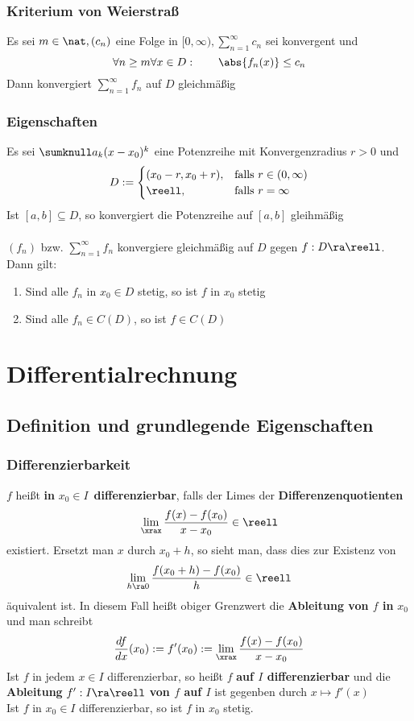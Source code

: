 \documentclass{kit}
\begin{document}
    \subsubsection{Kriterium von Weierstraß}
      Es sei $m\in\nat,(c_n)$ eine Folge in $[0,\infty),\sum^\infty_{n=1}c_n$ sei konvergent und
      $$\forall n\ge m\forall x\in D:\qquad\abs{f_n(x)}\le c_n$$
      Dann konvergiert $\sum^\infty_{n=1}f_n$ auf $D$ gleichmäßig
    \subsubsection{Eigenschaften}
      Es sei $\sumknull a_k(x-x_0)^k$ eine Potenzreihe mit Konvergenzradius $r>0$ und
      $$D:=\begin{cases}
        (x_0-r,x_0+r), & \text{falls }r\in(0,\infty)\\
        \reell, & \text{falls }r=\infty
      \end{cases}$$
      Ist $[a,b]\subseteq D$, so konvergiert die Potenzreihe auf $[a,b]$ gleihmäßig\\
      \\
      $(f_n)$ bzw. $\sum^\infty_{n=1}f_n$ konvergiere gleichmäßig auf $D$ gegen $f:D\ra\reell$. Dann gilt:
      \begin{enumerate}
        \item Sind alle $f_n$ in $x_0\in D$ stetig, so ist $f$ in $x_0$ stetig
        \item Sind alle $f_n\in C(D)$, so ist $f\in C(D)$
      \end{enumerate}
\section{Differentialrechnung}
  \subsection{Definition und grundlegende Eigenschaften}
    \subsubsection{Differenzierbarkeit}
      $f$ heißt \textbf{in} $x_0\in I$ \textbf{differenzierbar}, falls der Limes der \textbf{Differenzenquotienten}
      $$\lim_\xrax\frac{f(x)-f(x_0)}{x-x_0}\in\reell$$
      existiert. Ersetzt man $x$ durch $x_0+h$, so sieht man, dass dies zur Existenz von
      $$\lim_{h\ra0}\frac{f(x_0+h)-f(x_0)}{h}\in\reell$$
      äquivalent ist. In diesem Fall heißt obiger Grenzwert die \textbf{Ableitung von $f$ in} $x_0$ und man schreibt
      $$\frac{df}{dx}(x_0):=f'(x_0):=\lim_\xrax\frac{f(x)-f(x_0)}{x-x_0}$$
      Ist $f$ in jedem $x\in I$ differenzierbar, so heißt $f$ \textbf{auf $I$ differenzierbar} und die \textbf{Ableitung} $f':I\ra\reell$ \textbf{von $f$ auf $I$} ist gegenben durch $x\mapsto f'(x)$\\
      Ist $f$ in $x_0\in I$ differenzierbar, so ist $f$ in $x_0$ stetig.
\end{document}
